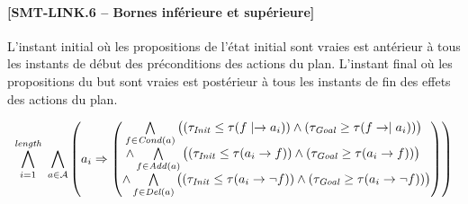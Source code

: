 \paragraph*{[SMT-LINK.6 -- Bornes inférieure et supérieure]}

L’instant initial où les propositions de l’état initial sont vraies est antérieur à tous les instants de début des préconditions des actions du plan. L’instant final où les propositions du but sont vraies est postérieur à tous les instants de fin des effets des actions du plan.

\begin{small}
\[
\BigforallTwo{i=1}{\length}~\Bigforall{\substack{\a\in \A}}%
\left(\a_{i} \Rightarrow \begin{pmatrix}\Bigforall{\substack{\f\in \cond{\a}}} \begin{pmatrix}\left(\tau_{\mathit{Init}} \leq \tau(\f\mid\rightarrow\a_{i}) \right)%
 \wedge \left(\tau_{\mathit{Goal}} \geq \tau(\f\rightarrow\mid\a_{i})\right) \end{pmatrix}\hfill\\
 \wedge \Bigforall{\substack{\f\in \add{\a}}} \begin{pmatrix}\left(\tau_{\mathit{Init}} \leq \tau(\a_{i}\rightarrow \f) \right)%
 \wedge \left(\tau_{\mathit{Goal}} \geq \tau(\a_{i}\rightarrow \f)\right) \end{pmatrix}\hfill\\
 \wedge \Bigforall{\substack{\f\in \del{\a}}} \begin{pmatrix}\left(\tau_{\mathit{Init}} \leq \tau(\a_{i}\rightarrow \neg \f) \right)%
 \wedge \left(\tau_{\mathit{Goal}} \geq \tau(\a_{i}\rightarrow \neg \f)\right) \end{pmatrix} \end{pmatrix}\right)
\]
\end{small}